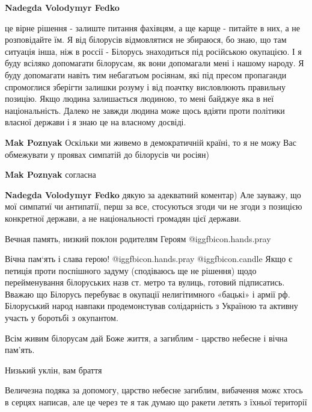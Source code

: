 \begin{itemize}
\begin{itemize}
\textbf{Nadegda Volodymyr Fedko} 

це вірне рішення - залиште питання фахівцям, а ще карще - питайте в них, а не
розповідайте їм. Я від білорусів відмовлятися не збираюся, бо знаю, що там
ситуація інша, ніж в россії - Білорусь знаходиться під російською окупацією. І
я буду всіляко допомагати білорусам, як вони допомагали мені і нашому народу. Я
буду допомагати навіть тим небагатьом росіянам, які під пресом пропаганди
спромоглися зберігти залишки розуму і від поачтку висловлюють правильну
позицію. Якщо людина залишається людиною, то мені байджуе яка в неї
національність. Далеко не завжди людина може щось вдіяти проти політики власної
держави і я знаю це на власному досвіді.

\textbf{Mak Poznyak} Оскільки ми живемо в демократичній країні, то я не можу Вас обмежувати у проявах симпатій до білорусів чи росіян)

\textbf{Mak Poznyak} согласна

\textbf{Nadegda Volodymyr Fedko} дякую за адекватний коментар) Але зауважу, що мої симпатиї чи антипатії, перш за все, стосуються згоди чи не згоди з позицією конкретної держави, а не національності громадян цієї держави.

\end{itemize} %

Вечная память, низкий поклон родителям Героям @igg{fbicon.hands.pray}


Вічна пам‘ять і слава герою!  @igg{fbicon.hands.pray}  @igg{fbicon.candle}  Якщо є петиція проти поспішного задуму
(сподіваюсь ще не рішення) щодо перейменування білоруських назв ст. метро та
вулиць, готовий підписатись. Вважаю що Білорусь перебуває в окупації
нелигітимного «бацькі» і армії рф. Білоруський народ навпаки продемонстував
солідарність з Україною та активну участь у боротьбі з окупантом.


Всім живим білорусам дай Боже життя, а загиблим - царство небесне і вічна пам'ять.

Низький уклін, вам браття


Величезна подяка за допомогу, царство небесне загиблим, вибачення можє хтось в
серцях написав, але це через те я так думаю що ракети летять з їхньої території


\end{itemize}
